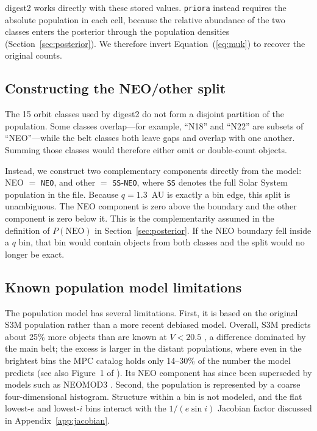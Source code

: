 \documentclass[linenumbers,twocolumn]{aastex701}
\newcommand{\priora}{{\tt priora}\xspace} %
\begin{document}
digest2 works directly with these stored values. \priora instead requires the
absolute population in each cell, because the relative abundance of the two
classes enters the posterior through the population densities
(Section~\ref{sec:posterior}). We therefore invert Equation~(\ref{eq:muk}) to
recover the original counts.

\subsection{Constructing the  NEO/other split}
\label{sec:split}

The 15 orbit classes used by digest2 do not form a disjoint partition of the
population. Some classes overlap---for example, ``N18'' and ``N22'' are
subsets of ``NEO''---while the belt classes both leave gaps and overlap with
one another. Summing those classes would therefore either omit or double-count
objects.

Instead, we construct two complementary components directly from the model:
NEO $=$ \texttt{NEO}, and other $=$ \texttt{SS}-\texttt{NEO}, where
\texttt{SS} denotes the full Solar System population in the file. Because
$q=1.3$~AU is exactly a bin edge, this split is unambiguous. The NEO component
is zero above the boundary and the other component is zero below it. This is
the complementarity assumed in the definition of
$P(\mathrm{NEO})$ in Section~\ref{sec:posterior}. If the NEO boundary fell
inside a $q$ bin, that bin would contain objects from both classes and the
split would no longer be exact.

\subsection{Known population model limitations}
\label{sec:popcaveats}

The population model has several limitations. First, it is based on the
original S3M population rather than a more recent debiased model. Overall,
S3M predicts about 25\% more objects than are known at $V<20.5$
\citep{wagg2025}, a difference dominated by the main belt; the excess is
larger in the distant populations, where even in the brightest bins the MPC
catalog holds only 14--30\% of the number the model predicts (see also
Figure~1 of \citealt{wagg2025}). Its NEO
component has since been superseded by models such as NEOMOD3 \citep{nesvorny2024}.
Second, the population is represented by a coarse four-dimensional histogram.
Structure within a bin is not modeled, and the flat lowest-$e$ and lowest-$i$
bins interact with the $1/(e\sin i)$ Jacobian factor discussed in
Appendix~\ref{app:jacobian}.
\end{document}
